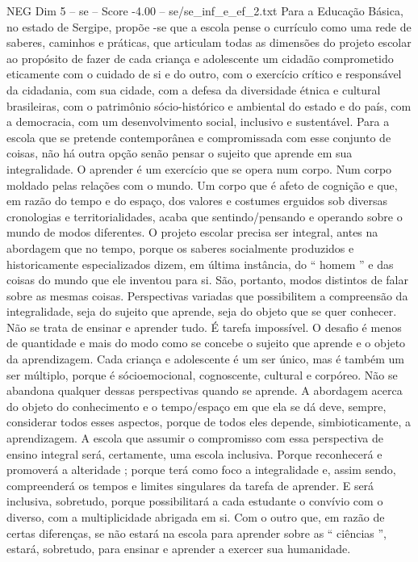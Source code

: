 \begin{textsample}{NEG Dim 5 – se – Score -4.00 – se/se\_inf\_e\_ef\_2.txt}
Para a Educação Básica, no estado de Sergipe, propõe -se que a escola pense o currículo como uma rede de saberes, caminhos e práticas, que articulam todas as dimensões do projeto escolar ao propósito de fazer de cada criança e adolescente um cidadão comprometido eticamente com o cuidado de si e do outro, com o exercício crítico e responsável da cidadania, com sua cidade, com a defesa da diversidade étnica e cultural brasileiras, com o patrimônio sócio-histórico e ambiental do estado e do país, com a democracia, com um desenvolvimento social, inclusivo e sustentável.
Para a escola que se pretende contemporânea e compromissada com esse conjunto de coisas, não há outra opção senão pensar o sujeito que aprende em sua integralidade.
O aprender é um exercício que se opera num corpo.
Num corpo moldado pelas relações com o mundo.
Um corpo que é afeto de cognição e que, em razão do tempo e do espaço, dos valores e costumes erguidos sob diversas cronologias e territorialidades, acaba que sentindo/pensando e operando sobre o mundo de modos diferentes.
O projeto escolar precisa ser integral, antes na abordagem que no tempo, porque os saberes socialmente produzidos e historicamente especializados dizem, em última instância, do “ homem ” e das coisas do mundo que ele inventou para si.
São, portanto, modos distintos de falar sobre as mesmas coisas.
Perspectivas variadas que possibilitem a compreensão da integralidade, seja do sujeito que aprende, seja do objeto que se quer conhecer.
Não se trata de ensinar e aprender tudo.
É tarefa impossível.
O desafio é menos de quantidade e mais do modo como se concebe o sujeito que aprende e o objeto da aprendizagem.
Cada criança e adolescente é um ser único, mas é também um ser múltiplo, porque é sócioemocional, cognoscente, cultural e corpóreo.
Não se abandona qualquer dessas perspectivas quando se aprende.
A abordagem acerca do objeto do conhecimento e o tempo/espaço em que ela se dá deve, sempre, considerar todos esses aspectos, porque de todos eles depende, simbioticamente, a aprendizagem.
A escola que assumir o compromisso com essa perspectiva de ensino integral será, certamente, uma escola inclusiva.
Porque reconhecerá e promoverá a alteridade ; porque terá como foco a integralidade e, assim sendo, compreenderá os tempos e limites singulares da tarefa de aprender.
E será inclusiva, sobretudo, porque possibilitará a cada estudante o convívio com o diverso, com a multiplicidade abrigada em si.
Com o outro que, em razão de certas diferenças, se não estará na escola para aprender sobre as “ ciências ”, estará, sobretudo, para ensinar e aprender a exercer sua humanidade.

\end{textsample}
